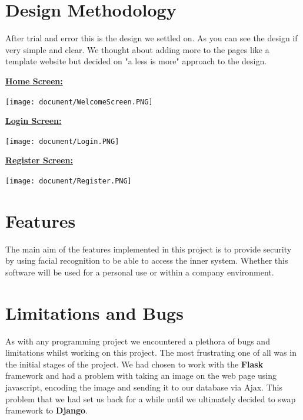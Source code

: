 \documentclass{article}
\begin{document}
\begin{flushleft}
\section{Design Methodology}
After trial and error this is the design we settled on. As you can see the design if very simple and clear. We thought about adding more to the pages like a template website but decided on "a less is more" approach to the design.

\begin{flushleft}
\textbf{\underline{Home Screen:}}
\end{flushleft}

\texttt{[image: document/WelcomeScreen.PNG]}

\begin{flushleft}
\textbf{\underline{Login Screen:}}
\end{flushleft}

\texttt{[image: document/Login.PNG]}
\newline
\begin{flushleft}
\textbf{\underline{Register Screen:}}
\end{flushleft}

\texttt{[image: document/Register.PNG]}
\label{fig:WebsiteImages}

\begin{flushleft}
\section{Features}
The main aim of the features implemented in this project is to provide security by using facial recognition to be able to access the inner system. Whether this software will be used for a personal use or within a company environment.
\newline



\section{Limitations and Bugs}
As with any programming project we encountered a plethora of bugs and limitations whilst working on this project. The most frustrating one of all was in the initial stages of the project. We had chosen to work with the \textbf{Flask} framework and had a problem with taking an image on the web page using javascript, encoding the image and sending it to our database via Ajax. This problem that we had set us back for a while until we ultimately decided to swap framework to \textbf{Django}. 


\end{flushleft}
\end{flushleft}
\end{document}

